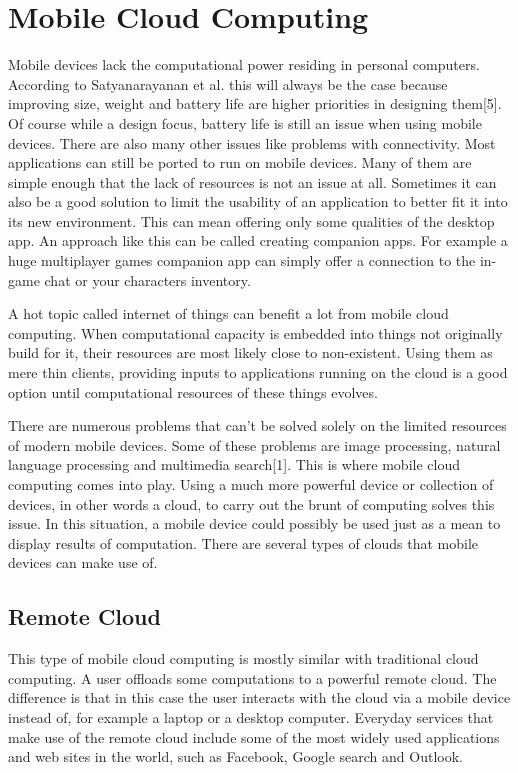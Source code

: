 \documentclass[conference]{IEEEtran}
\begin{document}
\section{Mobile Cloud Computing}
Mobile devices lack the computational power residing in personal computers. According to Satyanarayanan et al. this will always be the case because improving size, weight and battery life are higher priorities in designing them[5]. Of course while a design focus, battery life is still an issue when using mobile devices. There are also many other issues like problems with connectivity. Most applications can still be ported to run on mobile devices. Many of them are simple enough that the lack of resources is not an issue at all. Sometimes it can also be a good solution to limit the usability of an application to better fit it into its new environment. This can mean offering only some qualities of the desktop app. An approach like this can be called creating companion apps. For example a huge multiplayer games companion app can simply offer a connection to the in-game chat or your characters inventory.
\par
A hot topic called internet of things can benefit a lot from mobile cloud computing. When computational capacity is embedded into things not originally build for it, their resources are most likely close to non-existent. Using them as mere thin clients, providing inputs to applications running on the cloud is a good option until computational resources of these things evolves.
\par
There are numerous problems that can't be solved solely on the limited resources of modern mobile devices. Some of these problems are image processing, natural language processing and multimedia search[1]. This is where mobile cloud computing comes into play. Using a much more powerful device or collection of devices, in other words a cloud, to carry out the brunt of computing solves this issue. In this situation, a mobile device could possibly be used just as a mean to display results of computation. There are several types of clouds that mobile devices can make use of.\\

\subsection{Remote Cloud}
This type of mobile cloud computing is mostly similar with traditional cloud computing. A user offloads some computations to a powerful remote cloud. The difference is that in this case the user interacts with the cloud via a mobile device instead of, for example a laptop or a desktop computer. Everyday services that make use of the remote cloud include some of the most widely used applications and web sites in the world, such as Facebook, Google search and Outlook.
\end{document}
